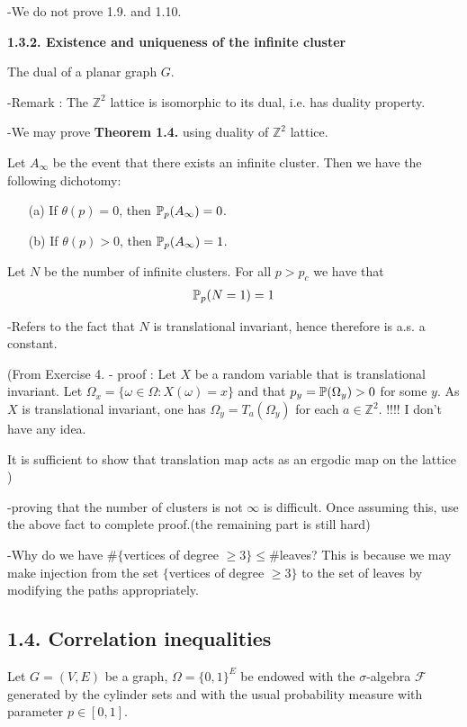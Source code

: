 \documentclass[10pt,a4paper]{report}
\begin{document}
-We do not prove 1.9. and 1.10.
\s

\textbf{1.3.2. Existence and uniqueness of the infinite cluster}
\s

 The dual of a planar graph $G$.

-Remark : The $\mathbb{Z}^2$ lattice is isomorphic to its dual, i.e. has duality property.

-We may prove \textbf{Theorem 1.4.} using duality of $\mathbb{Z}^2$ lattice.
\s

 Let $A_{\infty}$ be the event that there exists an infinite cluster. Then we have the following dichotomy:
\begin{itemize}
\item[(a)] If $\theta(p)=0$, then $\mathbb{P}_p(A_{\infty}) =0$.
\item[(b)] If $\theta(p)>0$, then $\mathbb{P}_p(A_{\infty}) =1$.
\end{itemize}
\s

 Let $N$ be the number of infinite clusters. For all $p > p_c$ we have that
\begin{align*}
\mathbb{P}_{p}(N=1) =1
\end{align*}

-Refers to the fact that $N$ is translational invariant, hence therefore is a.s. a constant.

(From Exercise 4. - proof : Let $X$ be a random variable that is translational invariant. Let $\Omega_x =\{\omega \in \Omega : X(\omega) =x \}$ and that $p_y = \mathbb{P}(\Omega_y) >0$ for some $y$. As $X$ is translational invariant, one has $\Omega_y = T_a(\Omega_y)$ for each $a\in \mathbb{Z}^2$. !!!! I don't have any idea.

It is sufficient to show that translation map acts as an ergodic map on the lattice
)

-proving that the number of clusters is not $\infty$ is difficult. Once assuming this, use the above fact to complete proof.(the remaining part is still hard)

-Why do we have $\#\{$vertices of degree $\geq 3\} \leq \#$leaves? This is because we may make injection from the set $\{$vertices of degree $\geq 3\}$ to the set of leaves by modifying the paths appropriately.
\s

\subsection*{1.4. Correlation inequalities}

Let $G=(V,E)$ be a graph, $\Omega =\{0,1\}^E$ be endowed with the $\sigma$-algebra $\mathscr{F}$ generated by the cylinder sets and with the usual probability measure with parameter $p\in [0,1]$.
\s
\end{document}
